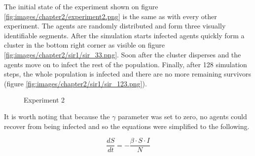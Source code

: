 The initial state of the experiment shown on figure \ref{fig:images/chapter2/experiment2.png} is the same as with every other experiment.
The agents are randomly distributed and form three visually identifiable segments.
After the simulation starts infected agents quickly form a cluster in the bottom right corner as visible on figure \ref{fig:images/chapter2/sir1/sir_33.png}.
Soon after the cluster disperses and the agents move on to infect the rest of the population.
Finally, after 128 simulation steps, the whole population is infected and there are no more remaining survivors (figure \ref{fig:images/chapter2/sir1/sir_123.png}).

\begin{figure}[H]
    \centering
    \hspace*{\fill}
    \hspace*{\fill}

    \caption{Experiment 2} \label{fig:experiment1}
\end{figure}

It is worth noting that because the $\gamma$ parameter was set to zero, no agents could recover from being infected and so the equations were simplified to the following.

\begin{equation} \label{eq:sir1_gamma0}
    \frac{{dS}}{{dt}} = -\frac{{\beta \cdot S \cdot I}}{{N}}
\end{equation}

